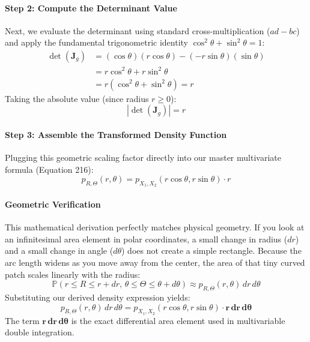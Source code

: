 \documentclass{article}
\begin{document}
\paragraph{Step 2: Compute the Determinant Value}
Next, we evaluate the determinant using standard cross-multiplication ($ad - bc$) and apply the fundamental trigonometric identity $\cos^2 \theta + \sin^2 \theta = 1$:
\begin{align*}
\det(\mathbf{J}_g) &= (\cos \theta)(r \cos \theta) - (-r \sin \theta)(\sin \theta) \\
&= r \cos^2 \theta + r \sin^2 \theta \\
&= r \left( \cos^2 \theta + \sin^2 \theta \right) = r
\end{align*}
Taking the absolute value (since radius $r \ge 0$):
\begin{equation}
\left| \det(\mathbf{J}_g) \right| = r \tag{218}
\end{equation}

\paragraph{Step 3: Assemble the Transformed Density Function}
Plugging this geometric scaling factor directly into our master multivariate formula (Equation 216):
\begin{equation}
p_{R, \Theta}(r, \theta) = p_{X_1, X_2}(r \cos \theta, r \sin \theta) \cdot r \tag{219}
\end{equation}

\paragraph{Geometric Verification}
This mathematical derivation perfectly matches physical geometry. If you look at an infinitesimal area element in polar coordinates, a small change in radius ($dr$) and a small change in angle ($d\theta$) does not create a simple rectangle. Because the arc length widens as you move away from the center, the area of that tiny curved patch scales linearly with the radius:
\begin{equation}
\mathbb{P}(r \le R \le r + dr, \, \theta \le \Theta \le \theta + d\theta) \approx p_{R, \Theta}(r, \theta) \, dr \, d\theta \tag{220}
\end{equation}
Substituting our derived density expression yields:
\begin{equation}
p_{R, \Theta}(r, \theta) \, dr \, d\theta = p_{X_1, X_2}(r \cos \theta, r \sin \theta) \cdot \mathbf{r \, dr \, d\theta} \tag{221}
\end{equation}
The term $\mathbf{r \, dr \, d\theta}$ is the exact differential area element used in multivariable double integration.
\end{document}
